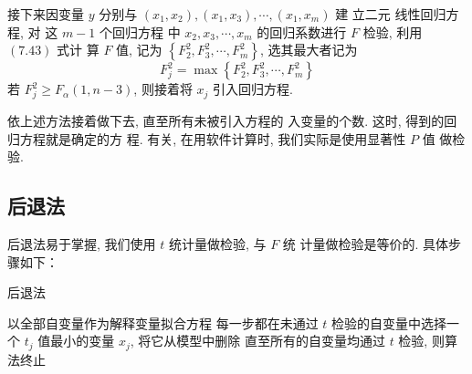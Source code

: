 接下来因变量 \( y \) 分别与 \( \left(x_{1}, x_{2}\right),\left(x_{1}, x_{3}\right), \cdots,\left(x_{1}, x_{m}\right) \) 建
立二元 线性回归方程, 对 这 \( {m}-{1} \) 个回归方程 中 \( x_{2}, x_{3}, \cdots, x_{m} \) 的回归系数进行 \( F \) 检验, 利用 \( (7.43) \) 式计 算 \( {F} \) 值, 记为 \( \left\{{F}_{2}^{2}, {F}_{3}^{2}, \cdots, {F}_{m}^{2}\right\} \), 选其最大者记为
$$
F_{j}^{2}=\max \left\{F_{2}^{2}, F_{3}^{2}, \cdots, F_{m}^{2}\right\}
$$
若 \( {F}_{j}^{2} \geq {F}_{\alpha} {( 1 , n - 3 )} \), 则接着将 \( {x}_{{j}} \) 引入回归方程. 

依上述方法接着做下去, 直至所有未被引入方程的
入变量的个数. 这时, 得到的回归方程就是确定的方
程. 
有关, 在用软件计算时, 我们实际是使用显著性 \( {P} \) 值
做检验. 

\subsection{后退法}

后退法易于掌握, 我们使用 \( t \) 统计量做检验, 与 \( {F} \) 统
计量做检验是等价的. 具体步骤如下：

\begin{algorithm}
    \caption{后退法}
    以全部自变量作为解释变量拟合方程\;
    每一步都在未通过 \( {t} \) 检验的自变量中选择一个
\( {t}_{j} \) 值最小的变量 \( {x}_{j} \), 将它从模型中删除\;
    直至所有的自变量均通过 \( {t} \) 检验, 则算法终止\;
\end{algorithm}
